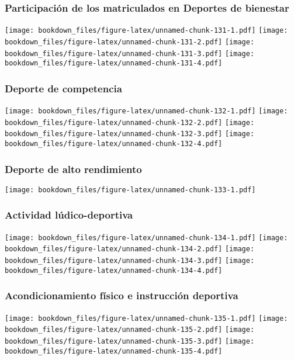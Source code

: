 \documentclass[]{article}
\theoremstyle{definition}
\theoremstyle{definition}
\theoremstyle{definition}
\theoremstyle{remark}
\begin{document}
\subsubsection{Participación de los matriculados en Deportes de
bienestar}\label{participacion-de-los-matriculados-en-deportes-de-bienestar}

\texttt{[image: bookdown\_files/figure-latex/unnamed-chunk-131-1.pdf]}
\texttt{[image: bookdown\_files/figure-latex/unnamed-chunk-131-2.pdf]}
\texttt{[image: bookdown\_files/figure-latex/unnamed-chunk-131-3.pdf]}
\texttt{[image: bookdown\_files/figure-latex/unnamed-chunk-131-4.pdf]}

\subsubsection{Deporte de competencia}\label{deporte-de-competencia}

\texttt{[image: bookdown\_files/figure-latex/unnamed-chunk-132-1.pdf]}
\texttt{[image: bookdown\_files/figure-latex/unnamed-chunk-132-2.pdf]}
\texttt{[image: bookdown\_files/figure-latex/unnamed-chunk-132-3.pdf]}
\texttt{[image: bookdown\_files/figure-latex/unnamed-chunk-132-4.pdf]}

\subsubsection{Deporte de alto
rendimiento}\label{deporte-de-alto-rendimiento}

\texttt{[image: bookdown\_files/figure-latex/unnamed-chunk-133-1.pdf]}

\subsubsection{Actividad
lúdico-deportiva}\label{actividad-ludico-deportiva}

\texttt{[image: bookdown\_files/figure-latex/unnamed-chunk-134-1.pdf]}
\texttt{[image: bookdown\_files/figure-latex/unnamed-chunk-134-2.pdf]}
\texttt{[image: bookdown\_files/figure-latex/unnamed-chunk-134-3.pdf]}
\texttt{[image: bookdown\_files/figure-latex/unnamed-chunk-134-4.pdf]}

\subsubsection{Acondicionamiento físico e instrucción
deportiva}\label{acondicionamiento-fisico-e-instruccion-deportiva}

\texttt{[image: bookdown\_files/figure-latex/unnamed-chunk-135-1.pdf]}
\texttt{[image: bookdown\_files/figure-latex/unnamed-chunk-135-2.pdf]}
\texttt{[image: bookdown\_files/figure-latex/unnamed-chunk-135-3.pdf]}
\texttt{[image: bookdown\_files/figure-latex/unnamed-chunk-135-4.pdf]}
\end{document}
